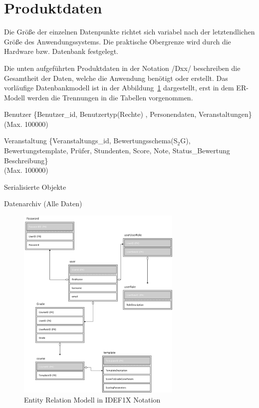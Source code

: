 	
	
	\section{Produktdaten}
	
		Die Größe der einzelnen Datenpunkte richtet sich variabel nach der letztendlichen Größe des Anwendungssystems. Die praktische Obergrenze wird durch die Hardware bzw. Datenbank festgelegt. 
		
		Die unten aufgeführten Produktdaten in der Notation /Dxx/ beschreiben die Gesamtheit der Daten, welche die Anwendung benötigt oder erstellt. Das vorläufige Datenbankmodell ist in der Abbildung~\ref{fig:ERM} dargestellt, erst in dem ER-Modell werden die Trennungen in die Tabellen vorgenommen.
		
	 
		
	\begin{description}
	\item[/D10/] Benutzer \{Benutzer\_id, Benutzertyp(Rechte) , Personendaten, Veranstaltungen\}\\ (Max. 100000) 
	\item[/D20/] Veranstaltung \{Veranstaltungs\_id, Bewertungsschema(S$_2$G), Bewertungstemplate, Prüfer, Stundenten, Score, Note, Status\_Bewertung\, Beschreibung\} \\ (Max. 100000)
	\item[/D30/] Serialisierte Objekte
	\item[/D40/] Datenarchiv (Alle Daten)
	\end{description}
	
	
	\begin{figure}[H]
\centering
\includegraphics[width=0.7\textwidth]{./img/ERM}
\caption{Entity Relation Modell in IDEF1X Notation}
\label{fig:ERM}
\end{figure}

